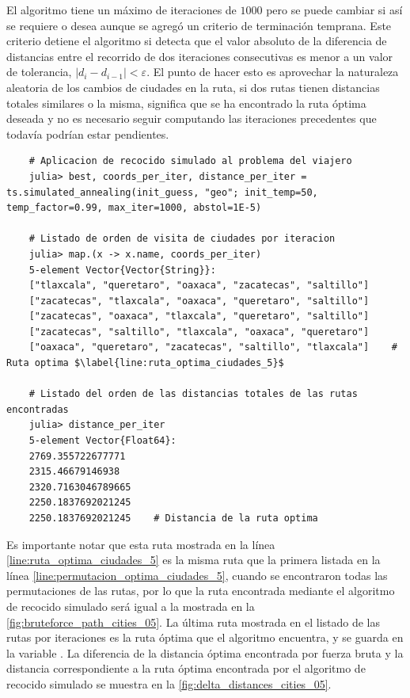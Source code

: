 El algoritmo tiene un máximo de iteraciones de $1000$ pero se puede cambiar si así se requiere o desea aunque se agregó un criterio de terminación temprana. Este criterio detiene el algoritmo si detecta que el valor absoluto de la diferencia de distancias entre el recorrido de dos iteraciones consecutivas es menor a un valor de tolerancia, $|d_{i} - d_{i-1}| < \varepsilon$. El punto de hacer esto es aprovechar la naturaleza aleatoria de los cambios de ciudades en la ruta, si dos rutas tienen distancias totales similares o la misma, significa que se ha encontrado la ruta óptima deseada y no es necesario seguir computando las iteraciones precedentes que todavía podrían estar pendientes.
\begin{verbatim}
    # Aplicacion de recocido simulado al problema del viajero
    julia> best, coords_per_iter, distance_per_iter = ts.simulated_annealing(init_guess, "geo"; init_temp=50, temp_factor=0.99, max_iter=1000, abstol=1E-5)

    # Listado de orden de visita de ciudades por iteracion
    julia> map.(x -> x.name, coords_per_iter)
    5-element Vector{Vector{String}}:
    ["tlaxcala", "queretaro", "oaxaca", "zacatecas", "saltillo"]
    ["zacatecas", "tlaxcala", "oaxaca", "queretaro", "saltillo"]
    ["zacatecas", "oaxaca", "tlaxcala", "queretaro", "saltillo"]
    ["zacatecas", "saltillo", "tlaxcala", "oaxaca", "queretaro"]
    ["oaxaca", "queretaro", "zacatecas", "saltillo", "tlaxcala"]    # Ruta optima $\label{line:ruta_optima_ciudades_5}$

    # Listado del orden de las distancias totales de las rutas encontradas
    julia> distance_per_iter
    5-element Vector{Float64}:
    2769.355722677771
    2315.46679146938
    2320.7163046789665
    2250.1837692021245
    2250.1837692021245    # Distancia de la ruta optima
\end{verbatim}
Es importante notar que esta ruta mostrada en la línea \ref{line:ruta_optima_ciudades_5} es la misma ruta que la primera listada en la línea \ref{line:permutacion_optima_ciudades_5}, cuando se encontraron todas las permutaciones de las rutas, por lo que la ruta encontrada mediante el algoritmo de recocido simulado será igual a la mostrada en la \cref{fig:bruteforce_path_cities_05}. La última ruta mostrada en el listado de las rutas por iteraciones es la ruta óptima que el algoritmo encuentra, y se guarda en la variable . La diferencia de la distancia óptima encontrada por fuerza bruta y la distancia correspondiente a la ruta óptima encontrada por el algoritmo de recocido simulado se muestra en la \cref{fig:delta_distances_cities_05}.
